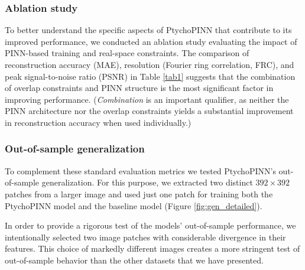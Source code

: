 \documentclass[sn-mathphys]{sn-jnl}%
\theoremstyle{thmstyleone}%
\theoremstyle{thmstyletwo}%
\theoremstyle{thmstylethree}%
\begin{document}
\subsubsection{Ablation study}

To better understand the specific aspects of PtychoPINN that contribute to its improved performance, we conducted an ablation study evaluating the impact of PINN-based training and real-space constraints. The comparison of reconstruction accuracy (MAE), resolution (Fourier ring correlation, FRC), and peak signal-to-noise ratio (PSNR) in Table \ref{tab1} suggests that the combination of overlap constraints and PINN structure is the most significant factor in improving performance. (\emph{Combination} is an important qualifier, as neither the PINN architecture nor the overlap constraints yields a substantial improvement in reconstruction accuracy when used individually.)

\subsubsection{Out-of-sample generalization}
To complement these standard evaluation metrics we tested PtychoPINN's out-of-sample generalization. For this purpose, we extracted two distinct $392 \times 392$ patches from a larger image and used just one patch for training both the PtychoPINN model and the baseline model (Figure \ref{fig:gen_detailed}).

In order to provide a rigorous test of the models' out-of-sample performance, we intentionally selected two image patches with considerable divergence in their features. This choice of markedly different images creates a more stringent test of out-of-sample behavior than the other datasets that we have presented.
\end{document}
